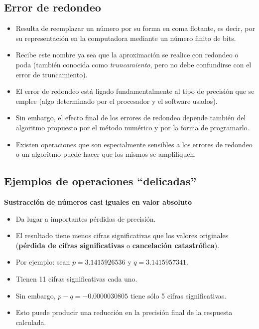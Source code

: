 \documentclass[openany]{book}
\providecommand{\tightlist}{%
  \setlength{\itemsep}{0pt}\setlength{\parskip}{0pt}}
\begin{document}
\hypertarget{error-de-redondeo}{%
\subsection{Error de redondeo}\label{error-de-redondeo}}

\begin{itemize}
\tightlist
\item
  Resulta de reemplazar un número por su forma en coma flotante, es decir, por su representación en la computadora mediante un número finito de bits.
\item
  Recibe este nombre ya sea que la aproximación se realice con redondeo o poda (también conocida como \emph{truncamiento}, pero no debe confundirse con el error de truncamiento).
\item
  El error de redondeo está ligado fundamentalmente al tipo de precisión que se emplee (algo determinado por el procesador y el software usados).
\item
  Sin embargo, el efecto final de los errores de redondeo depende también del algoritmo propuesto por el método numérico y por la forma de programarlo.
\item
  Existen operaciones que son especialmente sensibles a los errores de redondeo o un algoritmo puede hacer que los mismos se amplifiquen.
\end{itemize}

\hypertarget{ejemplos-de-operaciones-delicadas}{%
\subsection{Ejemplos de operaciones ``delicadas''}\label{ejemplos-de-operaciones-delicadas}}

\textbf{Sustracción de números casi iguales en valor absoluto}

\begin{itemize}
\tightlist
\item
  Da lugar a importantes pérdidas de precisión.
\item
  El resultado tiene menos cifras significativas que los valores originales (\textbf{pérdida de cifras significativas} o \textbf{cancelación catastrófica}).
\item
  Por ejemplo: sean \(p = 3.1415926536\) y \(q = 3.1415957341\).
\item
  Tienen 11 cifras significativas cada uno.
\item
  Sin embargo, \(p - q = -0.0000030805\) tiene sólo 5 cifras significativas.
\item
  Esto puede producir una reducción en la precisión final de la respuesta calculada.
\end{itemize}
\end{document}
